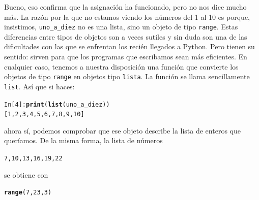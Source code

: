\documentclass[10pt,a4paper]{article}\usepackage[]{graphicx}\usepackage[]{color}
\makeatletter
\newcommand{\hlnum}[1]{\textcolor[rgb]{0.686,0.059,0.569}{#1}}%
\newcommand{\hlstd}[1]{\textcolor[rgb]{0.345,0.345,0.345}{#1}}%
\newcommand{\hlkwd}[1]{\textcolor[rgb]{0.737,0.353,0.396}{\textbf{#1}}}%
\newenvironment{kframe}{%
 \def\at@end@of@kframe{}%
 \ifinner\ifhmode%
  \def\at@end@of@kframe{\end{minipage}}%
  \begin{minipage}{\columnwidth}%
 \fi\fi%
 \def\FrameCommand##1{\hskip\@totalleftmargin \hskip-\fboxsep
 \colorbox{shadecolor}{##1}\hskip-\fboxsep
     \hskip-\linewidth \hskip-\@totalleftmargin \hskip\columnwidth}%
 \MakeFramed {\advance\hsize-\width
   \@totalleftmargin\z@ \linewidth\hsize
   \@setminipage}}%
 {\par\unskip\endMakeFramed%
 \at@end@of@kframe}
\newenvironment{knitrout}{}{} %
\makeatother
\begin{document}
Bueno, eso confirma que la asignación ha funcionado, pero no nos dice mucho más. La razón por la que no estamos viendo los números del 1 al 10 es porque, insistimos, \verb#uno_a_diez# no es una lista, sino un objeto de tipo {\tt range}. Estas diferencias entre tipos de objetos son a veces sutiles y sin duda son una de las dificultades con las que se enfrentan los recién llegados a Python. Pero tienen su sentido: sirven para que los programas que escribamos sean más eficientes. En cualquier caso, tenemos a nuestra disposición una función que convierte los objetos de tipo {\tt range} en objetos tipo {\tt lista}. La función se llama sencillamente {\tt list}. Así que si haces:
\begin{knitrout}
\color{fgcolor}\begin{kframe}
\begin{alltt}
In [4]: \hlkwd{print}(\hlkwd{list}(uno_a_diez))
[1, 2, 3, 4, 5, 6, 7, 8, 9, 10]
\end{alltt}
\end{kframe}
\end{knitrout}
ahora sí, podemos comprobar que ese objeto describe la lista de enteros que queríamos. De la misma forma, la lista de números
\begin{knitrout}
\color{fgcolor}\begin{kframe}
\begin{alltt}
7, 10, 13, 16, 19, 22
\end{alltt}
\end{kframe}
\end{knitrout}
se obtiene con
\begin{knitrout}
\color{fgcolor}\begin{kframe}
\begin{alltt}
\hlkwd{range}\hlstd{(}\hlnum{7}\hlstd{,} \hlnum{23}\hlstd{,} \hlnum{3}\hlstd{)}
\end{alltt}
\end{kframe}
\end{knitrout}
\end{document}
